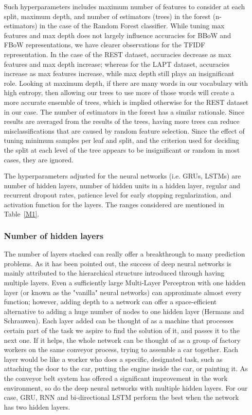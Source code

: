 \documentclass[comsoc,conference]{IEEEtran}
\begin{document}
Such hyperparameters includes maximum number of features to consider at each split, maximum depth, and number of estimators (trees) in the forest (n-estimators) in the case of the Random Forest classifier. While tuning max features and max depth does not largely influence accuracies for BBoW and FBoW representations, we have clearer observations for the TFIDF representation. In the case of the REST dataset, accuracies decrease as max features and max depth increase; whereas for the LAPT dataset, accuracies increase as max features increase, while max depth still plays an insignificant role. Looking at maximum depth, if there are many words in our vocabulary with high entropy, then allowing our trees to use more of those words will create a more accurate ensemble of trees, which is implied otherwise for the REST dataset in our case. The number of estimators in the forest has a similar rationale. Since results are averaged from the results of the trees, having more trees can reduce misclassifications that are caused by random feature selection. Since the effect of tuning minimum samples per leaf and split, and the criterion used for deciding the split at each level of the tree appears to be insignificant or random in most cases, they are ignored. 

The hyperparameters adjusted for the neural networks (i.e. GRUs, LSTMs) are number of hidden layers, number of hidden units in a hidden layer, regular and recurrent dropout rates, patience level for early stopping regularization, and activation function for the layers. The ranges considered are mentioned in Table~\ref{M1}. 

\subsubsection{Number of hidden layers}

The number of layers stacked can really offer a breakthrough to many prediction problems. As it has been pointed out, the success of deep neural networks is mainly attributed to the hierarchical structure introduced through having multiple layers. Even a sufficiently large Multi-Layer Perceptron with one hidden layer (or known as the "vanilla" neural networks) can approximate almost every function; however, adding depth to a network can offer a space-efficient alternative to adding a huge number of nodes to one hidden layer (Hermans and Schrauwen). Each layer added can be thought of as a machine that processes certain part of the task we aspire to find the solution of it, and passes it to the next one. If it helps, the whole network can be thought of as a group of factory workers on the same conveyor process, trying to assemble a car together. Each layer would be like a worker who does a specific, designated task, such as attaching the door to the car, putting the engine inside the car, or painting it. As the conveyor belt system has offered a significant improvement in the work environment, so do the deep neural networks with multiple hidden layers. For our case, GRU, RNN and bi-directional LSTM perform the best when the network has two hidden layers. 
\end{document}
